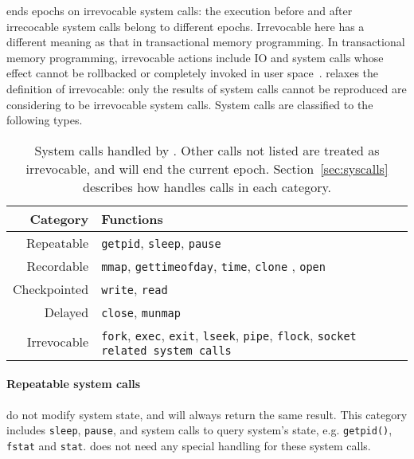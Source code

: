 \doubletake{} ends epochs on irrevocable system calls: the execution before
and after irrecocable system calls belong to different epochs.
Irrevocable here has a different meaning as that in transactional memory programming. 
In transactional memory programming, irrevocable actions include IO and system calls whose
effect cannot be rollbacked or completely invoked in user space~\cite{Irrevocabletrans}.
\doubletake{} relaxes the definition of irrevocable: only the results of system calls cannot be 
reproduced are considering to be irrevocable system calls. 
System calls are classified to the following types.

\begin{table}[t]
	\centering
	\small
	\renewcommand{\arraystretch}{1.5}
	\begin{tabular}{r|p{6cm}}
		\textbf{Category} & \textbf{Functions} \\
		\hline
		
		Repeatable		& \texttt{getpid}, \texttt{sleep}, \texttt{pause}\\
		
		Recordable		& \texttt{mmap}, \texttt{gettimeofday}, \texttt{time}, 
						  \texttt{clone} , \texttt{open}\\
		
		Checkpointed		& \texttt{write}, \texttt{read} \\
		
		Delayed			& \texttt{close}, \texttt{munmap} \\
		
		Irrevocable		& \texttt{fork}, \texttt{exec}, \texttt{exit}, \texttt{lseek}, \texttt{pipe}, \texttt{flock}, \texttt{socket related system calls}\\
	\end{tabular}
	\caption{
		System calls handled by \doubletake{}. Other calls not listed are treated as irrevocable, and will end the current epoch. Section~\ref{sec:syscalls} describes how \doubletake{} handles calls in each category.
		\label{tbl:syscalls}
	}
\end{table}

\label{sec:syscalls}
\paragraph{Repeatable system calls} do not modify system state, and will always return the same result.
This category includes \texttt{sleep}, \texttt{pause}, and system calls to query system's state, e.g. \texttt{getpid()}, \texttt{fstat} and \texttt{stat}. 
\doubletake{} does not need any special handling for these system calls.
	
